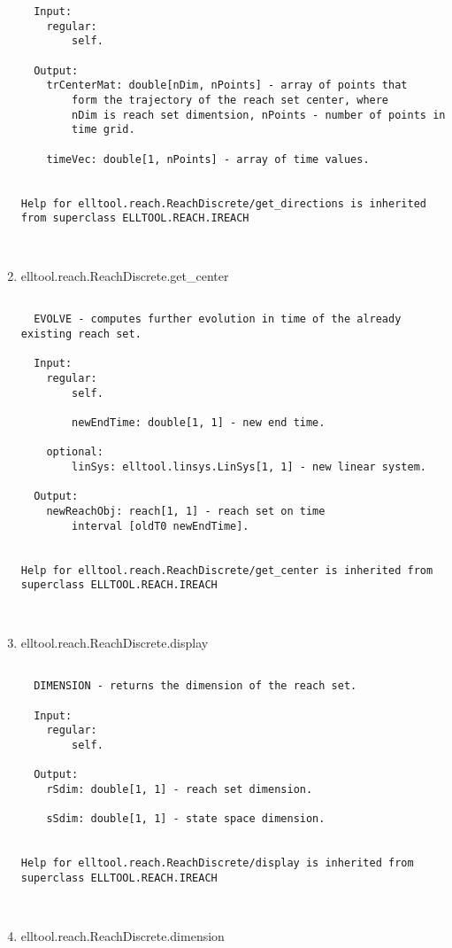\begin{enumerate}
\begin{lstlisting}
  Input:
    regular:
        self.

  Output:
    trCenterMat: double[nDim, nPoints] - array of points that
        form the trajectory of the reach set center, where
        nDim is reach set dimentsion, nPoints - number of points in
        time grid.

    timeVec: double[1, nPoints] - array of time values.


Help for elltool.reach.ReachDiscrete/get_directions is inherited from superclass ELLTOOL.REACH.IREACH



\end{lstlisting}
\fontfamily{\familydefault}
\selectfont
\item {elltool.reach.ReachDiscrete.get\_center}
\selectfont
\begin{lstlisting}

  EVOLVE - computes further evolution in time of the already existing reach set.

  Input:
    regular:
        self.

        newEndTime: double[1, 1] - new end time.

    optional:
        linSys: elltool.linsys.LinSys[1, 1] - new linear system.

  Output:
    newReachObj: reach[1, 1] - reach set on time
        interval [oldT0 newEndTime].


Help for elltool.reach.ReachDiscrete/get_center is inherited from superclass ELLTOOL.REACH.IREACH



\end{lstlisting}
\fontfamily{\familydefault}
\selectfont
\item {elltool.reach.ReachDiscrete.display}
\selectfont
\begin{lstlisting}

  DIMENSION - returns the dimension of the reach set.

  Input:
    regular:
        self.

  Output:
    rSdim: double[1, 1] - reach set dimension.

    sSdim: double[1, 1] - state space dimension.


Help for elltool.reach.ReachDiscrete/display is inherited from superclass ELLTOOL.REACH.IREACH



\end{lstlisting}
\fontfamily{\familydefault}
\selectfont
\item {elltool.reach.ReachDiscrete.dimension}
\selectfont
\begin{lstlisting}


\end{lstlisting}
\end{enumerate}

